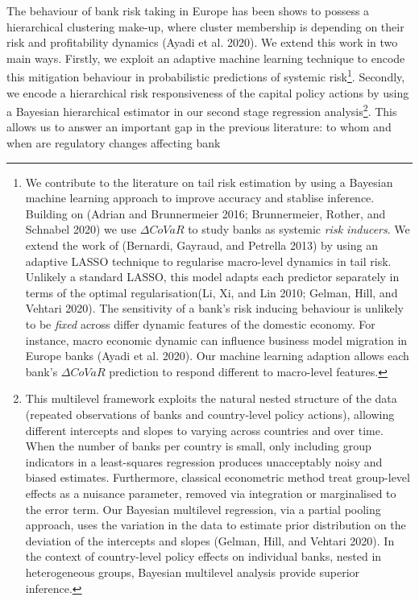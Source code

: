 \documentclass[
  10pt,
]{article}
\begin{document}
The behaviour of bank risk taking in Europe has been shows to possess a
hierarchical clustering make-up, where cluster membership is depending
on their risk and profitability dynamics (Ayadi et al. 2020). We extend
this work in two main ways. Firstly, we exploit an adaptive machine
learning technique to encode this mitigation behaviour in probabilistic
predictions of systemic risk\footnote{We contribute to the literature on
  tail risk estimation by using a Bayesian machine learning approach to
  improve accuracy and stablise inference. Building on (Adrian and
  Brunnermeier 2016; Brunnermeier, Rother, and Schnabel 2020) we use
  \(\Delta CoVaR\) to study banks as systemic \emph{risk inducers}. We
  extend the work of (Bernardi, Gayraud, and Petrella 2013) by using an
  adaptive LASSO technique to regularise macro-level dynamics in tail
  risk. Unlikely a standard LASSO, this model adapts each predictor
  separately in terms of the optimal regularisation(Li, Xi, and Lin
  2010; Gelman, Hill, and Vehtari 2020). The sensitivity of a bank's
  risk inducing behaviour is unlikely to be \emph{fixed} across differ
  dynamic features of the domestic economy. For instance, macro economic
  dynamic can influence business model migration in Europe banks (Ayadi
  et al. 2020). Our machine learning adaption allows each bank's
  \(\Delta CoVaR\) prediction to respond different to macro-level
  features.}. Secondly, we encode a hierarchical risk responsiveness of
the capital policy actions by using a Bayesian hierarchical estimator in
our second stage regression analysis\footnote{This multilevel framework
  exploits the natural nested structure of the data (repeated
  observations of banks and country-level policy actions), allowing
  different intercepts and slopes to varying across countries and over
  time. When the number of banks per country is small, only including
  group indicators in a least-squares regression produces unacceptably
  noisy and biased estimates. Furthermore, classical econometric method
  treat group-level effects as a nuisance parameter, removed via
  integration or marginalised to the error term. Our Bayesian multilevel
  regression, via a partial pooling approach, uses the variation in the
  data to estimate prior distribution on the deviation of the intercepts
  and slopes (Gelman, Hill, and Vehtari 2020). In the context of
  country-level policy effects on individual banks, nested in
  heterogeneous groups, Bayesian multilevel analysis provide superior
  inference.}. This allows us to answer an important gap in the previous
literature: to whom and when are regulatory changes affecting bank
\end{document}
